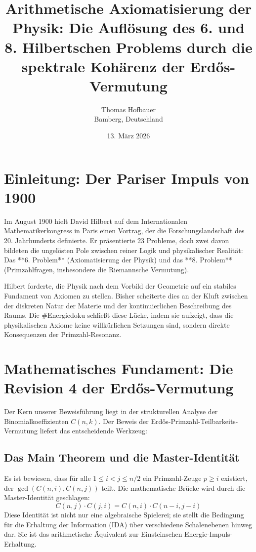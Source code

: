 \documentclass[12pt,a4paper]{article}
\title{\textbf{Arithmetische Axiomatisierung der Physik: Die Auflösung des 6. und 8. Hilbertschen Problems durch die spektrale Kohärenz der Erdős-Vermutung}}
\author{Thomas Hofbauer \\ \small Bamberg, Deutschland}
\date{13. März 2026}
\begin{document}
	
	\maketitle
	
	\section{Einleitung: Der Pariser Impuls von 1900}
	Im August 1900 hielt David Hilbert auf dem Internationalen Mathematikerkongress in Paris einen Vortrag, der die Forschungslandschaft des 20. Jahrhunderts definierte. Er präsentierte 23 Probleme, doch zwei davon bildeten die ungelösten Pole zwischen reiner Logik und physikalischer Realität: Das **6. Problem** (Axiomatisierung der Physik) und das **8. Problem** (Primzahlfragen, insbesondere die Riemannsche Vermutung).
	
	Hilbert forderte, die Physik nach dem Vorbild der Geometrie auf ein stabiles Fundament von Axiomen zu stellen. Bisher scheiterte dies an der Kluft zwischen der diskreten Natur der Materie und der kontinuierlichen Beschreibung des Raums. Die \#Energiedoku schließt diese Lücke, indem sie aufzeigt, dass die physikalischen Axiome keine willkürlichen Setzungen sind, sondern direkte Konsequenzen der Primzahl-Resonanz.
	
	\section{Mathematisches Fundament: Die Revision 4 der Erdős-Vermutung}
	Der Kern unserer Beweisführung liegt in der strukturellen Analyse der Binomialkoeffizienten $C(n,k)$. Der Beweis der Erdős-Primzahl-Teilbarkeits-Vermutung liefert das entscheidende Werkzeug:
	
	\subsection{Das Main Theorem und die Master-Identität}
	Es ist bewiesen, dass für alle $1 \le i < j \le n/2$ ein Primzahl-Zeuge $p \ge i$ existiert, der $\gcd(C(n,i), C(n,j))$ teilt. Die mathematische Brücke wird durch die Master-Identität geschlagen:
	\begin{equation}
		C(n,j) \cdot C(j,i) = C(n,i) \cdot C(n-i, j-i)
	\end{equation}
	Diese Identität ist nicht nur eine algebraische Spielerei; sie stellt die Bedingung für die Erhaltung der Information (IDA) über verschiedene Schalenebenen hinweg dar. Sie ist das arithmetische Äquivalent zur Einsteinschen Energie-Impuls-Erhaltung.
	
\end{document}

